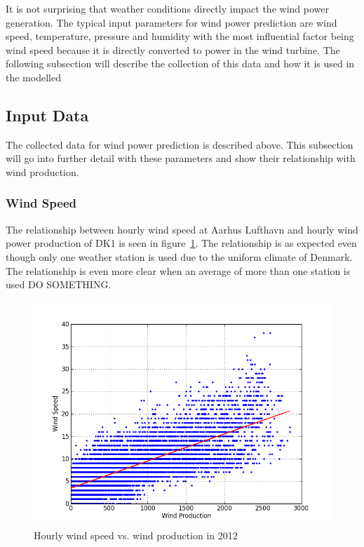 It is not surprising that weather conditions directly impact the wind power generation. The typical input parameters for wind power prediction are wind speed, temperature, pressure and humidity \cite{WindPowerGenerationUsingANN} with the most influential factor being wind speed because it is directly converted to power in the wind turbine. The following subsection will describe the collection of this data and how it is used in the modelled 

\subsection{Input Data}
The collected data for wind power prediction is described above. This subsection will go into further detail with these parameters and show their relationship with wind production.

\subsubsection{Wind Speed}
The relationship between hourly wind speed at Aarhus Lufthavn and hourly wind power production of DK1 is seen in figure~\ref{fig:windVsProd}. The relationship is as expected even though only one weather station is used due to the uniform climate of Denmark.
The relationship is even more clear when an average of more than one station is used DO SOMETHING.  

\begin{figure}[h!]
\centering
\includegraphics[width=0.99\linewidth,natwidth=898,natheight=587]{billeder/WindSpeedVsProduction.png}
\caption{Hourly wind speed vs. wind production in 2012}
\label{fig:windVsProd}
\end{figure}

